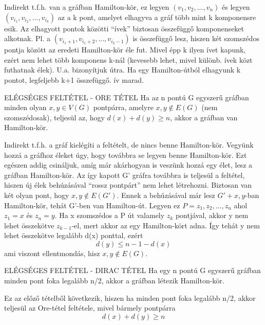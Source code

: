 \begin{bizonyitas}{}
Indirekt t.f.h. van a gráfban Hamilton-kör, ez legyen $(v_1, v_2,..., v_n)$ és legyen $(v_{i_1}, v_{i_2},...,v_{i_k})$ az a k pont, amelyet elhagyva a gráf több mint k komponensre esik. Az elhagyott pontok közötti ``ívek'' biztosan összefüggő komponenseket alkotnak. Pl. a $(v_{i_{1}+1}, v_{i_{1}+2},..., v_{i_{2}-1})$ is összefüggő lesz, hiszen két szomszédos pontja között az eredeti Hamilton-kör éle fut. Mivel épp k ilyen ívet kapunk, ezért nem lehet több komponens k-nál (kevesebb lehet, mivel különb. ívek közt futhatnak élek). U.a. bizonyítjuk útra. Ha egy Hamilton-útból elhagyunk k pontot, legfeljebb k+1 összefüggő. ív marad.
\end{bizonyitas}

\begin{tetel}{ELÉGSÉGES FELTÉTEL - ORE TÉTEL}
Ha az n pontú G egyszerű gráfban minden olyan $x,y\in V(G)$ pontpárra, amelyre ${x,y}\not\in E(G)$ (nem szomszédosak), teljesül az, hogy $d(x) + d(y) \geq n$, akkor a gráfban van Hamilton-kör.
\end{tetel}

\begin{bizonyitas}{}
Indirekt t.f.h. a gráf kielégíti a feltételt, de nincs benne Hamilton-kör. Vegyünk hozzá a gráfhoz éleket úgy, hogy továbbra se legyen benne Hamilton-kör. Ezt egészen addig csináljuk, amíg már akárhogyan is veszünk hozzá egy élet, lesz a gráfban Hamilton-kör. Az így kapott G' gráfra továbbra is teljesül a feltétel, hiszen új élek behúzásával ``rossz pontpárt'' nem lehet létrehozni. Biztosan van két olyan pont, hogy ${x,y} \not \in E(G')$. Ennek a behúzásával már lesz $G' + {x,y}$-ban Hamilton-kör, tehát G'-ben van Hamilton-út. Legyen ez $P = {z_1, z_2,...,z_n}$ ahol $z_1 = x$ és $z_n = y$.
Ha x szomszédos a P út valamely $z_k$ pontjával, akkor y nem lehet összekötve $z_{k-1}$-el, mert akkor az egy Hamilton-kört adna. Így tehát y nem lehet összekötve legalább d(x) ponttal, ezért
$$d(y) \leq n - 1 - d(x)$$
ami viszont ellentmondás, hisz ${x,y} \not\in E(G)$.
\end{bizonyitas}

\begin{tetel}{ELÉGSÉGES FELTÉTEL - DIRAC TÉTEL}
Ha egy n pontú G egyszerű gráfban minden pont foka legalább n/2, akkor a gráfban létezik Hamilton-kör.
\end{tetel}

\begin{bizonyitas}{}
Ez az előző tételből következik, hiszen ha minden pont foka legalább n/2, akkor teljesül az Ore-tétel feltétele, mivel bármely pontpárra $$d(x) + d(y) \geq n$$
\end{bizonyitas}

